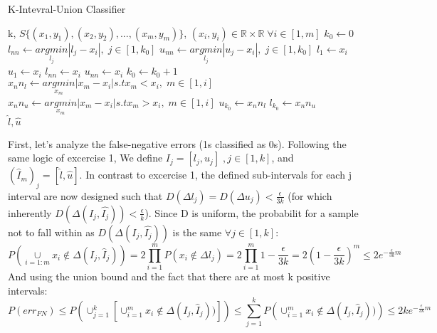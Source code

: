 \begin{algorithm}
    \caption{K-Intevral-Union Classifier}\label{alg:cap}
    \begin{algorithmic}
        \Require k, $S\{(x_1, y_1), (x_2, y_2), ..., (x_m, y_m)\}$, $(x_i, y_i) \in \mathbb{R} \times \mathbb{R} \;  \forall i \in [1, m]$
        \State $k_0 \gets 0$
            \State $l_{nn} \gets \underset{l_j}{argmin} |l_j - x_i|, \; j\in[1, k_0]$
            \State $u_{nn} \gets \underset{l_j}{argmin} |u_j - x_i|, \; j\in[1, k_0]$
                    \State $l_1 \gets x_i$
                    \State $u_1 \gets x_i$
                \Else
                        \State $l_{nn} \gets x_i$
                    \EndIf
                        \State $u_{nn} \gets x_i$
                    \EndIf
                \EndIf
            \Else
                 
                    \State $k_0 \gets k_0 + 1$
                    \State $x_nn_l \gets \underset{x_m}{argmin} |x_m - x_i| s.t x_m < x_i, \; m\in[1, i]$
                    \State $x_nn_u \gets \underset{x_m}{argmin} |x_m - x_i| s.t x_m > x_i, \; m\in[1, i]$
                    \State $u_{k_0} \gets x_nn_l$
                    \State $l_{k_0} \gets x_nn_u$
                \EndIf
            \EndIf
        \EndFor \\
    \Return $\hat{l}, \hat{u}$
    \end{algorithmic}
\end{algorithm}

First, let's analyze the false-negative errors (1s classified as 0s).
Following the same logic of excercise 1, We define $I_j = [l_j, u_j] \;, j\in [1, k]$, and $(\hat{I}_m)_j = [\hat{l}, \hat{u}]$.
In contrast to excercise 1, the defined sub-intervals for each j interval are now designed such that $D(\Delta l_j) = D(\Delta u_j) < \frac{\epsilon}{3k}$
(for which inherently $D(\Delta(I_j, \hat{I_j})) < \frac{\epsilon}{k}$). Since D is uniform, the probabilit for a sample not to fall within as $D(\Delta(I_j, \hat{I_j}))$ is the same $\forall j\in[1, k]$:
\begin{equation*}
    P(\underset{i=1:m}{\cup} x_i \notin \Delta(I_j, \hat{I}_j)) = 2\prod_{i=1}^{m}P(x_i \notin \Delta l_j) 
    = 2\prod_{i=1}^{m} 1-\frac{\epsilon}{3k}= 2(1-\frac{\epsilon}{3k})^m \leq 2e^{-\frac{\epsilon}{3k}m}
\end{equation*}
And using the union bound and the fact that there are at most k positive intervals:
\begin{equation*}
    P(err_{FN}) \leq P\left(\cup_{j=1}^{k} \left[ \cup_{i=1}^{m} x_i \notin \Delta(I_j, \hat{I}_j)) \right]\right) \leq \sum_{j=1}^{k} P\left(\cup_{i=1}^{m} x_i \notin \Delta(I_j, \hat{I}_j))\right) \leq 2ke^{-\frac{\epsilon}{3k}m}
\end{equation*}


